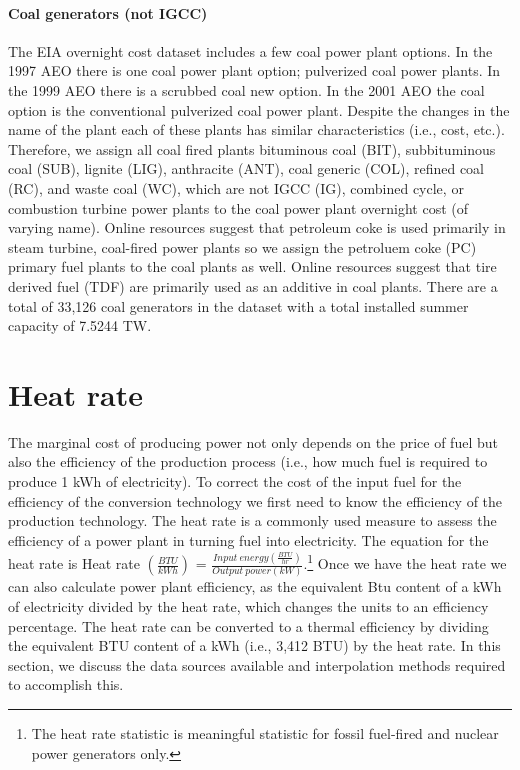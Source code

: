 \documentclass[10pt]{report}
\begin{document}
\subsubsection{Coal generators (not IGCC)}
The EIA overnight cost dataset includes a few coal power plant options. 
In the 1997 AEO there is one coal power plant option; pulverized coal power plants.
In the 1999 AEO there is a scrubbed coal new option. 
In the 2001 AEO the coal option is the conventional pulverized coal power plant.
Despite the changes in the name of the plant each of these plants has similar characteristics (i.e., cost, etc.).
Therefore, we assign all coal fired plants bituminous coal (BIT), subbituminous coal (SUB), lignite (LIG), anthracite (ANT), coal generic (COL), refined coal (RC), and waste coal (WC), which are not IGCC (IG), combined cycle, or combustion turbine power plants to the coal power plant overnight cost (of varying name).
Online resources suggest that petroleum coke is used primarily in steam turbine, coal-fired power plants so we assign the petroluem coke (PC) primary fuel plants to the coal plants as well.  
Online resources suggest that tire derived fuel (TDF) are primarily used as an additive in coal plants. 
There are a total of 33,126 coal generators in the dataset with a total installed summer capacity of 7.5244 TW. 

\chapter{Heat rate}
The marginal cost of producing power not only depends on the price of fuel but also the efficiency of the production process (i.e., how much fuel is required to produce 1 kWh of electricity). 
To correct the cost of the input fuel for the efficiency of the conversion technology we first need to know the efficiency of the production technology.
The heat rate is a commonly used measure to assess the efficiency of a power plant in turning fuel into electricity. 
The equation for the heat rate is Heat rate $(\frac{BTU}{kWh})$ = $\frac{Input\ energy (\frac{BTU}{hr})}{Output\ power (kW)}$.\footnote{The heat rate statistic is meaningful statistic for fossil fuel-fired and nuclear power generators only.}  
Once we have the heat rate we can also calculate power plant efficiency, as the equivalent Btu content of a kWh of electricity divided by the heat rate, which changes the units to an efficiency percentage.
The heat rate can be converted to a thermal efficiency by dividing the equivalent BTU content of a kWh (i.e., 3,412 BTU) by the heat rate.
In this section, we discuss the data sources available and interpolation methods required to accomplish this. 
\end{document}

